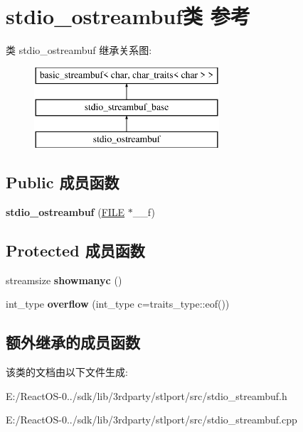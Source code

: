 \hypertarget{classstdio__ostreambuf}{}\section{stdio\+\_\+ostreambuf类 参考}
\label{classstdio__ostreambuf}
类 stdio\+\_\+ostreambuf 继承关系图\+:\begin{figure}[H]
\begin{center}
\leavevmode
\includegraphics[height=3.000000cm]{classstdio__ostreambuf}
\end{center}
\end{figure}
\subsection*{Public 成员函数}
\begin{DoxyCompactItemize}
\item 
\mbox{\label{classstdio__ostreambuf_ada64f3ad79ae5c498d3e04712badb113}} 
{\bfseries stdio\+\_\+ostreambuf} (\hyperlink{struct__iobuf}{F\+I\+LE} $\ast$\+\_\+\+\_\+f)
\end{DoxyCompactItemize}
\subsection*{Protected 成员函数}
\begin{DoxyCompactItemize}
\item 
\mbox{\label{classstdio__ostreambuf_ab7b8cb74d58ba27b892438b4032756ff}} 
streamsize {\bfseries showmanyc} ()
\item 
\mbox{\label{classstdio__ostreambuf_adc6ee1915d3e32d46bba944e74779b20}} 
int\+\_\+type {\bfseries overflow} (int\+\_\+type c=traits\+\_\+type\+::eof())
\end{DoxyCompactItemize}
\subsection*{额外继承的成员函数}


该类的文档由以下文件生成\+:\begin{DoxyCompactItemize}
\item 
E\+:/\+React\+O\+S-\/0../sdk/lib/3rdparty/stlport/src/stdio\+\_\+streambuf.\+h\item 
E\+:/\+React\+O\+S-\/0../sdk/lib/3rdparty/stlport/src/stdio\+\_\+streambuf.\+cpp\end{DoxyCompactItemize}
